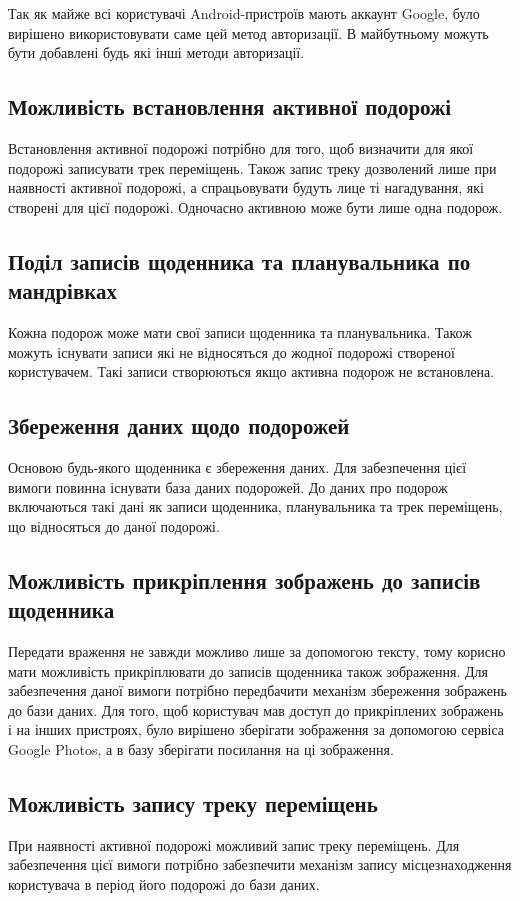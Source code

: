 \documentclass[../main.tex]{subfiles}
\begin{document}
Так як майже всі користувачі Android-пристроїв мають аккаунт Google, було вирішено використовувати саме цей метод авторизації. В майбутньому можуть бути добавлені будь які інші методи авторизації.

\subsection{Можливість встановлення активної подорожі}
Встановлення активної подорожі потрібно для того, щоб визначити для якої подорожі записувати трек переміщень. Також запис треку дозволений лише при наявності активної подорожі, а спрацьовувати будуть лице ті нагадування, які створені для цієї подорожі. Одночасно активною може бути лише одна подорож.

\subsection{Поділ записів щоденника та планувальника по мандрівках}
Кожна подорож може мати свої записи щоденника та планувальника. Також можуть існувати записи які не відносяться до жодної подорожі створеної користувачем. Такі записи створюються якщо активна подорож не встановлена.

\subsection{Збереження даних щодо подорожей}
Основою будь-якого щоденника є збереження даних. Для забезпечення цієї вимоги повинна існувати база даних подорожей. До даних про подорож включаються такі дані як записи щоденника, планувальника та трек переміщень, що відносяться до даної подорожі.

\subsection{Можливість прикріплення зображень до записів щоденника}
Передати враження не завжди можливо лише за допомогою тексту, тому корисно мати можливість прикріплювати до записів щоденника також зображення. Для забезпечення даної вимоги потрібно передбачити механізм збереження зображень до бази даних. Для того, щоб користувач мав доступ до прикріплених зображень і на інших пристроях, було вирішено зберігати зображення за допомогою сервіса Google Photos, а в базу зберігати посилання на ці зображення.

\subsection{Можливість запису треку переміщень}
При наявності активної подорожі можливий запис треку переміщень. Для забезпечення цієї вимоги потрібно забезпечити механізм запису місцезнаходження користувача в період його подорожі до бази даних.
\end{document}
